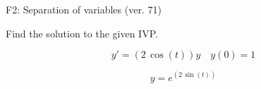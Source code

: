 \begin{exercise}
  \begin{exerciseTitle}F2: Separation of variables (ver. 71)\end{exerciseTitle}
  \begin{exerciseStatement}
    
Find the solution to the given IVP.

    
\[y'=( 2 \, \cos\left(t\right) )y\hspace{1em} y(0)= 1\]

  \end{exerciseStatement}
  \begin{exerciseAnswer}
    
\[y= e^{\left(2 \, \sin\left(t\right)\right)}\]

  \end{exerciseAnswer}
\end{exercise}